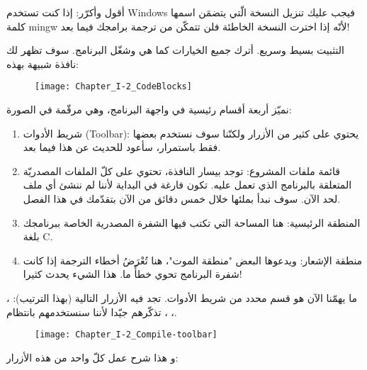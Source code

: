 \begin{critical}
أقول وأكرّر: إذا كنت تستخدم
\textenglish{Windows}
فيجب عليك تنزيل النسخة الّتي يتضمَن اسمها كلمة
\textenglish{mingw}
لأنّه إذا اخترت النسخة الخاطئة فلن تتمكّن من ترجمة برامجك فيما بعد!
\end{critical}

التثبيت بسيط وسريع.  أترك جميع الخيارات كما هي وشغّل البرنامج. سوف تظهر لك نافذة شبيهة بهذه:

\begin{figure}[H]
	\centering
	\texttt{[image: Chapter\_I-2\_CodeBlocks]}
\end{figure}

نميّز أربعة أقسام رئيسية في واجهة البرنامج، وهي مرقّمة في الصورة:

\begin{enumerate}
  \item شريط الأدوات
(\textenglish{Toolbar}):
يحتوي على كثير من الأزرار ولكنّنا سوف نستخدم بعضها فقط باستمرار، سأعود للحديث عن هذا فيما بعد.
  \item قائمة ملفات المشروع: توجد بيسار النافذة، تحتوي على كلّ الملفات المصدريّة المتعلقة بالبرنامج الذي تعمل عليه. تكون فارغة في البداية لأننا لم ننشئ أي ملف لحد الآن. سوف نبدأ بملئها خلال خمس دقائق من الآن بتقدّمك في هذا الفصل.
  \item المنطقة الرئيسية: هنا المساحة التي تكتب فيها الشفرة المصدرية الخاصة ببرنامجك بلغة \textenglish{C}.
  \item منطقة الإشعار: ويدعوها البعض "منطقة الموت"، هنا تُعْرَضُ أخطاء الترجمة إذا كانت شفرة البرنامج تحوي خطأً ما. هذا الشيء يحدث كثيرا!
\end{enumerate}

ما يهمّنا الآن هو قسم محدد من شريط الأدوات. تجد فيه الأزرار التالية (بهذا الترتيب):
،
،
،
تذكّرهم جيّدا لأننا سنستخدمهم بانتظام.

\begin{figure}[H]
	\centering
	\texttt{[image: Chapter\_I-2\_Compile-toolbar]}
\end{figure}

و هذا شرح عمل كلّ واحد من هذه الأزرار:

